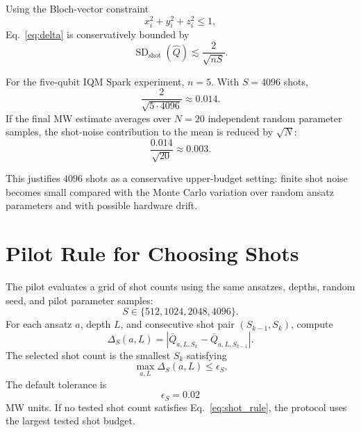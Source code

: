 \documentclass[11pt]{article}
\begin{document}
Using the Bloch-vector constraint
\begin{equation}
x_i^2+y_i^2+z_i^2 \leq 1,
\end{equation}
Eq.~\eqref{eq:delta} is conservatively bounded by
\begin{equation}
\operatorname{SD}_{\mathrm{shot}}(\hat Q)
\lesssim
\frac{2}{\sqrt{nS}}.
\label{eq:shot_bound}
\end{equation}

For the five-qubit IQM Spark experiment, \(n=5\). With \(S=4096\) shots,
\begin{equation}
\frac{2}{\sqrt{5\cdot4096}}
\approx
0.014.
\end{equation}
If the final MW estimate averages over \(N=20\) independent random parameter
samples, the shot-noise contribution to the mean is reduced by \(\sqrt{N}\):
\begin{equation}
\frac{0.014}{\sqrt{20}}
\approx
0.003.
\end{equation}

This justifies \(4096\) shots as a conservative upper-budget setting: finite
shot noise becomes small compared with the Monte Carlo variation over random
ansatz parameters and with possible hardware drift.

\section{Pilot Rule for Choosing Shots}

The pilot evaluates a grid of shot counts using the same ansatzes, depths,
random seed, and pilot parameter samples:
\begin{equation}
S \in \{512,1024,2048,4096\}.
\end{equation}
For each ansatz \(a\), depth \(L\), and consecutive shot pair
\((S_{k-1},S_k)\), compute
\begin{equation}
\Delta_S(a,L)
=
\left|
\bar Q_{a,L,S_k}
-
\bar Q_{a,L,S_{k-1}}
\right|.
\end{equation}
The selected shot count is the smallest \(S_k\) satisfying
\begin{equation}
\max_{a,L}\Delta_S(a,L)
\leq
\epsilon_S.
\label{eq:shot_rule}
\end{equation}
The default tolerance is
\begin{equation}
\epsilon_S = 0.02
\end{equation}
MW units. If no tested shot count satisfies Eq.~\eqref{eq:shot_rule}, the
protocol uses the largest tested shot budget.
\end{document}
